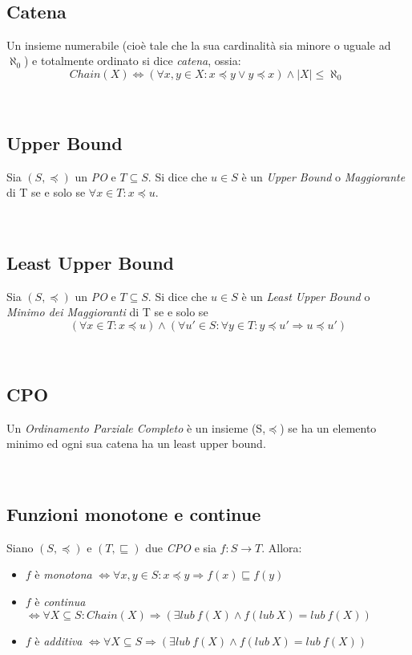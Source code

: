 \documentclass[a4paper, 10pt]{article} %
\begin{document}
\
\subsection{Catena}
\begin{definizione}[Catena]
  Un insieme numerabile (cioè tale che la sua cardinalità sia minore o uguale ad $\aleph_0 $) e totalmente ordinato si dice \emph{catena}, ossia:
  $$ Chain(X) \Longleftrightarrow (\forall x,y \in X : x \preceq y \lor y \preceq x) \land |X| \leq \aleph_0 \ $$
\end{definizione}

\
\subsection{Upper Bound}
\begin{definizione}
  Sia $(S,\preceq)$ un \emph{PO} e $T\subseteq S$. Si dice che $u \in S$ è un \emph{Upper Bound} o \emph{Maggiorante} di T se e solo se $ \forall x \in T : x \preceq u $.
\end{definizione}

\
\subsection{Least Upper Bound}
\begin{definizione}[Least Upper Bound]
  Sia $(S,\preceq)$ un \emph{PO} e $T\subseteq S$. Si dice che $u \in S$ è un \emph{Least Upper Bound} o \emph{Minimo dei Maggioranti} di T se e solo se $$( \forall x \in T : x \preceq u ) \land (\forall u' \in S : \forall y \in T : y \preceq u' \Rightarrow u \preceq u') $$
\end{definizione}

\
\subsection{CPO}
\begin{definizione}[CPO]
  Un \emph{Ordinamento Parziale Completo} è un insieme (S,$\preceq$) se ha un elemento minimo ed ogni sua catena ha un least upper bound.
\end{definizione}

\
\subsection{Funzioni monotone e continue}
\begin{definizione}
  Siano $(S,\preceq)$ e $(T,\sqsubseteq)$ due \emph{CPO} e sia $ f:S\rightarrow T$. Allora:
  \begin{itemize}
  \item $f$ è \emph{monotona} $\Leftrightarrow \forall x,y \in S :
    x \preceq y \Rightarrow f(x) \sqsubseteq f(y)$
  \item $f$ è \emph{continua} $\Leftrightarrow \forall X \subseteq S : Chain(X) \Rightarrow (\exists lub\ f(X) \land f(lub\ X) = lub\ f(X))$
  \item $f$ è \emph{additiva} $\Leftrightarrow \forall X \subseteq S \Rightarrow (\exists lub\ f(X) \land f(lub\ X) = lub\ f(X))$
  \end{itemize}
\end{definizione}
\end{document}
